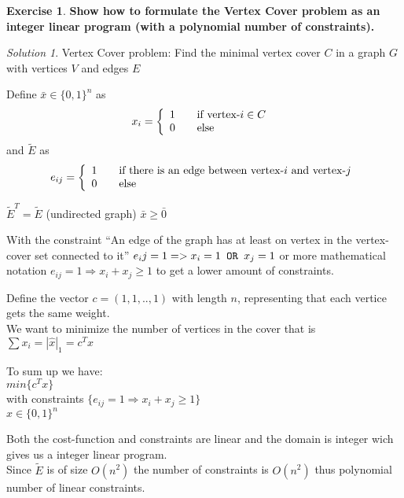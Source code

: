 \documentclass[a4paper,twoside=false,abstract=false,numbers=noenddot,
titlepage=false,headings=small,parskip=half,version=last]{scrartcl}
\theoremstyle{definition}
\newtheorem{exercise}{Exercise}
\theoremstyle{remark}
\newtheorem*{solution}{Solution}
\begin{document}
\begin{exercise}
{\bf
Show how to formulate the Vertex Cover problem as an integer linear program
(with a polynomial number of constraints).
}
\end{exercise}
\begin{solution}

Vertex Cover problem:
Find the minimal vertex cover $C$ in a graph $G$ with vertices $V$ and edges $E$

Define $\bar{x} \in \{0,1\}^n$ as 
\[
  x_i = \left\{
  \begin{array}{l l}
        1 & \quad \text{if vertex-$i \in C$ }\\
        0 & \quad \text{else}\\
  \end{array} \right.
\]
and $\tilde{E}$ as 
\[
    e_{ij} = \left\{
    \begin{array}{l l}
        1 & \quad \text{if there is an edge between vertex-$i$ and vertex-$j$}\\
        0 & \quad \text{else}\\
    \end{array} \right.
\]

$\tilde{E}^T=\tilde{E}$ (undirected graph)
$\bar{x} \ge \bar{0}$

With the constraint ``An edge of the graph has at least on vertex in the vertex-cover set connected to it''
$e_ij=1 => x_i=1 \verb+ OR + x_j=1$ or more mathematical notation $e_{ij}=1 \Rightarrow x_i + x_j \ge 1$ to get a lower amount of constraints. 

Define the vector $c = (1,1,..,1)$ with length $n$, representing that each vertice gets the same weight.\\
We want to minimize the number of vertices in the cover that is $\sum{x_i} = |\hat{x}|_1 = c^T x $

To sum up we have:\\
$min\{c^T x\}$ \\
with constraints $\{e_{ij}=1 \Rightarrow x_i + x_j \ge 1\}$\\
$x \in \{0,1\}^n$

Both the cost-function and constraints are linear and the domain is integer wich gives us a integer linear program.\\
Since $\tilde{E}$ is of size $O(n^2)$ the number of constraints is $O(n^2)$ thus polynomial number of linear constraints.

\end{solution}
\end{document}
